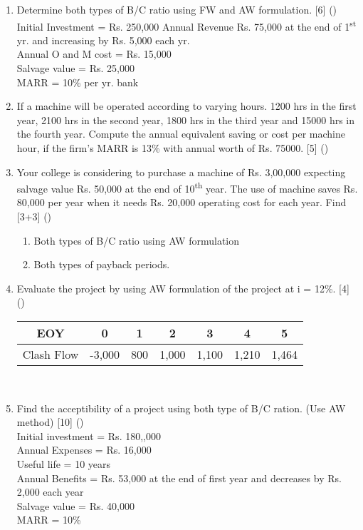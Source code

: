 \documentclass[12pt]{article}
\newcommand{\super}[1]{\textsuperscript{#1}}
\begin{document}
\begin{enumerate}[noitemsep, topsep = 0pt]
	\item Determine both types of B/C ratio using FW and AW formulation. \hfill [6] ()\\
	Initial Investment = Rs. 250,000
	Annual Revenue Rs. 75,000 at the end of 1\super{st} yr. and increasing by Rs. 5,000 each yr.\\
	Annual O and M cost = Rs. 15,000\\
	Salvage value = Rs. 25,000\\
	MARR = 10\% per yr. bank
	
	\item If a machine will be operated according to varying hours. 1200 hrs in the first year, 2100 hrs in the second year, 1800 hrs in the third year and 15000 hrs in the fourth year. Compute the annual equivalent saving or cost per machine hour, if the firm's MARR is 13\% with annual worth of Rs. 75000. \hfill [5] ()
	
	\item Your college is considering to purchase a machine of Rs. 3,00,000 expecting salvage value Rs. 50,000 at the end of 10\super{th} year. The use of machine saves Rs. 80,000 per year when it needs Rs. 20,000 operating cost for each year. Find \hfill [3+3] ()
	\begin{enumerate}[noitemsep, topsep = 0pt, label = \alph*]
		\item Both types of B/C ratio using AW formulation
		\item Both types of payback periods.
	\end{enumerate}
	
	\item Evaluate the project by using AW formulation of the project at i = 12\%. \hfill [4] ()\\
	\begin{tabular}{|c|c|c|c|c|c|c|}
		\hline
		EOY & 0 & 1 & 2 & 3 & 4 & 5\\ \hline
		Clash Flow & -3,000 & 800 & 1,000 & 1,100 & 1,210 & 1,464\\ \hline
	\end{tabular}\\[0pt]
	
	\item Find the acceptibility of a project using both type of B/C ration. (Use AW method) \hfill [10] ()\\
	Initial investment = Rs. 180,,000\\
	Annual Expenses = Rs. 16,000\\
	Useful life = 10 years\\
	Annual Benefits = Rs. 53,000 at the end of first year and decreases by Rs. 2,000 each year\\
	Salvage value = Rs. 40,000\\
	MARR = 10\%
\end{enumerate}
\end{document}
